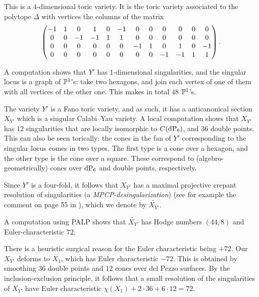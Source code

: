 This is a $4$-dimensional toric variety. It is the toric variety associated to the polytope $\Delta$ with vertices the columns of the matrix
\[
 \makeatletter\c@MaxMatrixCols=12\makeatother\begin{pmatrix}{-1}&      1&      0&      1&      0&      {-1}&      0&      0&      0&      0&      0&      0\\      0&      0&      {-1}&      {-1}&      1&      1&      0&      0&      0&      0&      0&      0\\      0&      0&      0&      0&      0&      0&      {-1}&      1&      0&      1&      0&      {-1}\\      0&      0&      0&      0&      0&      0&      0&      0&      {-1}&      {-1}&      1&      1\\      \end{pmatrix}.
\]

A computation shows that $Y'$ has $1$-dimensional singularities, and the singular locus is a graph of $\P^1$'s: take two hexagons, and join each vertex of one of them with all vertices of the other one. This makes in total $48$ $\P^1$'s.

The variety $Y'$ is a Fano toric variety, and as such, it has a anticanonical section $X_{Y'}$ which is a singular Calabi--Yau variety. A local computation shows that $X_{Y'}$ has $12$ singularities that are locally isomorphic to $C(\dP6)$, and $36$ double points. This can also be seen torically: the cones in the fan of $Y'$ corresponding to the singular locus comes in two types. The first type is a cone over a hexagon, and the other type is the cone over a square. These correspond to (algebro-geometrically) cones over $\dP6$ and double points, respectively.

Since $Y'$ is a four-fold, it follows that $X_{Y'}$ has a maximal projective crepant resolution of singularities (a \emph{MPCP-desingularization}) (see for example the comment on page 55 in \cite{mirrorsymmetry}), which we denote by $\widetilde{X_{Y'}}$.

A computation using PALP \cite{palp} shows that $\widetilde{X_{Y'}}$ has Hodge numbers $(44,8)$ and Euler-characteristic $72$. 

\begin{remark}
There is a heuristic surgical reason for the Euler characteristic being $+72$. Our $X_{Y'}$ deforms to $X_1$, which has Euler characteristic $-72$. This is obtained by smoothing $36$ double points and $12$ cones over del Pezzo surfaces. By the inclusion-exclusion principle, it follows that a small resolution of the singularities of $X_{Y'}$ have Euler characteristic $\chi(X_1)+2\cdot 36 + 6 \cdot 12=72$.
\end{remark}

